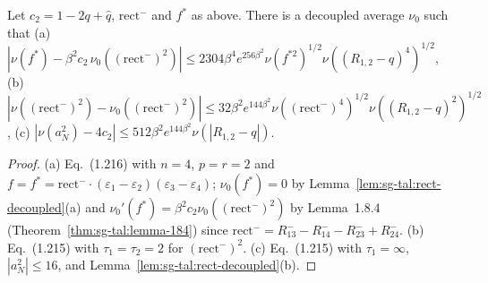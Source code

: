 \begin{lemma}
\label{lem:sg-tal:rect-comparisons}
  \leanok
{}
Let $c_2=1-2q+\hat q$, $\mathrm{rect}^-$ and $f^*$ as above.  There is a decoupled average $\nu_0$ such that
(a) $|\nu(f^*)-\beta^2c_2\,\nu_0((\mathrm{rect}^-)^2)|\le2304\beta^4e^{256\beta^2}\nu(f^{*2})^{1/2}\nu((R_{1,2}-q)^4)^{1/2}$,
(b) $|\nu((\mathrm{rect}^-)^2)-\nu_0((\mathrm{rect}^-)^2)|\le32\beta^2e^{144\beta^2}\nu((\mathrm{rect}^-)^4)^{1/2}\nu((R_{1,2}-q)^2)^{1/2}$,
(c) $|\nu(a_N^2)-4c_2|\le512\beta^2e^{144\beta^2}\nu(|R_{1,2}-q|)$.
\end{lemma}
\begin{proof}
  \leanok
(a) Eq.~(1.216) with $n=4$, $p=r=2$ and $f=f^*=\mathrm{rect}^-\cdot(\varepsilon_1-\varepsilon_2)(\varepsilon_3-\varepsilon_4)$; $\nu_0(f^*)=0$ by Lemma~\ref{lem:sg-tal:rect-decoupled}(a) and $\nu_0'(f^*)=\beta^2c_2\nu_0((\mathrm{rect}^-)^2)$ by Lemma~1.8.4 (Theorem~\ref{thm:sg-tal:lemma-184}) since $\mathrm{rect}^-=R^-_{13}-R^-_{14}-R^-_{23}+R^-_{24}$.  (b) Eq.~(1.215) with $\tau_1=\tau_2=2$ for $(\mathrm{rect}^-)^2$.  (c) Eq.~(1.215) with $\tau_1=\infty$, $|a_N^2|\le16$, and Lemma~\ref{lem:sg-tal:rect-decoupled}(b).
\end{proof}

